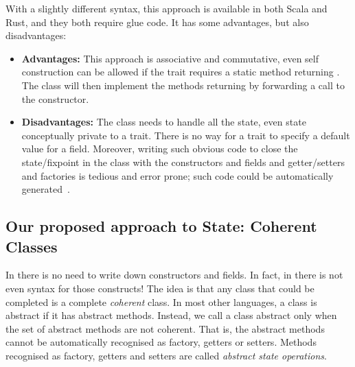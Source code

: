 \noindent 

With a slightly different syntax, this approach is available in both Scala and Rust, and they both require glue code.
It has some advantages, but also disadvantages: 

\begin{itemize}

\item {\bf Advantages:} This approach is associative and commutative, even self construction
  can be allowed if the trait requires a static method
  returning \Q@This@. The class will then implement the methods returning \Q@This@
  by forwarding a call to the constructor.
  
\item {\bf Disadvantages:}
The class needs to handle all the state, even state conceptually
   private to a trait. 
 There is no way for a trait to specify a default value for a field.
 Moreover, writing such obvious code to close
  the state/fixpoint in the class 
   with the constructors and fields and getter/setters and factories is tedious and error prone; such code could be automatically
   generated~\cite{wang2016classless}.
\end{itemize}

\subsection{Our proposed approach to State: Coherent Classes}

In \name there is no need to write down constructors and fields. In fact, in
\name there is not even syntax for those constructs!  The idea is that
any class that could be completed
  is a
  complete \emph{coherent} class.  In most other languages, a class is
abstract if it has abstract methods.  Instead, we call a class
abstract only when the set of abstract methods are not coherent. That
is, the abstract methods cannot be automatically recognised
as factory, getters or setters. Methods recognised as factory, getters and setters are called
\emph{abstract state operations}.
  

